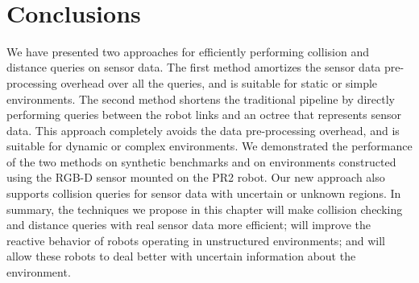\begin{table}[!ht]
\centering
{}
\\
\caption[Collision and distance query performance comparison between the baseline pipeline in~\cite{Rusu:RPG:2009} and our new pipeline on the PR2 robot]{Collision and distance query performance comparison between the baseline pipeline in~\cite{Rusu:RPG:2009} and our new pipeline on the PR2 robot (in ms). For the collision query, the broad-phase structure computed by the baseline algorithm improves the total computation only when there are more than $N_{min} = 3275$ collision queries for one frame of sensor data, and the total time required for $N_{min}$ queries is 4.29 ms. For the distance query, the broad-phase structure computed by the baseline algorithm improves the total computation only when there are more than $N_{min} = 18$ collision queries for one frame of sensor data, and the total time required for $N_{min}$ queries is 0.87 ms.
\label{table:8:pr2}}
\end{table}




\section{Conclusions}

We have presented two approaches for efficiently performing collision and distance
queries on sensor data. The first method amortizes the sensor data pre-processing
overhead over all the queries, and is suitable for static or simple
environments. The second method shortens the traditional pipeline by
directly performing queries between the robot links and an octree that
represents sensor data. This approach completely avoids the data
pre-processing overhead, and is suitable for dynamic or complex
environments. We demonstrated the performance of the two methods on
synthetic benchmarks and on environments constructed using the RGB-D
sensor mounted on the PR2 robot. Our new approach also supports
collision queries for sensor data with uncertain or unknown regions.
In summary, the techniques we propose in this chapter will make
collision checking and distance queries with real sensor data more efficient;
will improve the reactive behavior of robots operating in unstructured
environments; and will allow these robots to deal better with uncertain information
about the environment.

